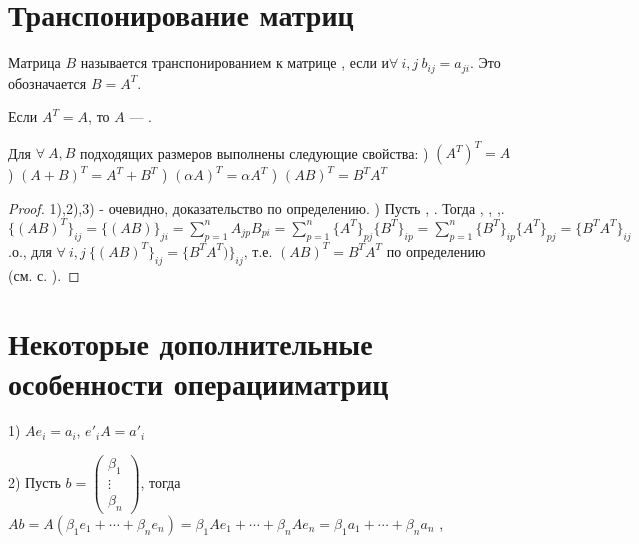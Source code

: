\section{Транспонирование матриц}
\begin{opred}
Матрица $B$ называется транспонированием к матрице , если  и $\forall\ i,j\ b_{ij}=a_{ji}$. Это обозначается $B=A^T$.
\end{opred}
\begin{remark}
Если $A^T=A$, то $A$ --- .
\end{remark}
\begin{theor}
Для $\forall\ A,B$ подходящих размеров выполнены следующие свойства:
) $(A^T)^T=A$
) $(A+B)^T=A^T+B^T$
) $(\alpha{}A)^T=\alpha{}A^T$
) $(AB)^T=B^TA^T $
\end{theor}
\begin{proof}
1),2),3) - очевидно, доказательство по определению.
) Пусть , . Тогда , , ,\newline{}.
\newline$\{(AB)^T\}_{ij}=\{(AB)\}_{ji}=\sum\limits_{p=1}^nA_{jp}B_{pi}=\sum\limits_{p=1}^n\{A^T\}_{pj}\{B^T\}_{ip}=\sum\limits_{p=1}^n\{B^T\}_{ip}\{A^T\}_{pj}=\{B^TA^T\}_{ij}$
.о., для $\forall\ i,j\ \{(AB)^T\}_{ij}=\{B^TA^T)\}_{ij}$, т.е. $(AB)^T=B^TA^T$ по определению (см. с. \pageref{eq_matrices}).
\end{proof}
\section{Некоторые дополнительные особенности операции матриц}
1) $Ae_i=a_i$, $e'_iA=a'_i$

2) Пусть $b=\begin{pmatrix}\beta_1 \\ \vdots \\ \beta_n\end{pmatrix}$, тогда $Ab=A(\beta_1e_1+\cdots+\beta_ne_n)=\beta_1Ae_1+\cdots+\beta_nAe_n=\beta_1a_1+\cdots+\beta_na_n$
\newline{}
, 

